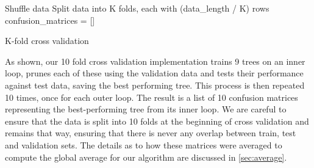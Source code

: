 \documentclass[11pt,twoside]{article}
\begin{document}
\begin{algorithm}
\footnotesize
\SetAlgoLined
{}
Shuffle data\;
Split data into K folds, each with (data\_length / K) rows\;
confusion\_matrices = []\;
\caption{K-fold cross validation} \label{alg:crossvalidation}
\end{algorithm}
\noindent
As shown, our 10 fold cross validation implementation trains 9 trees on an inner loop, prunes each of these using the validation data and tests their performance against test data, saving the best performing tree. This process is then repeated 10 times, once for each outer loop. The result is a list of 10 confusion matrices  representing the best-performing tree from its inner loop. We are careful to ensure that the data is split into 10 folds at the beginning of cross validation and remains that way, ensuring that there is never any overlap between train, test and validation sets. The details as to how these matrices were averaged to compute the global average for our algorithm are discussed in \autoref{sec:average}.
\end{document}
